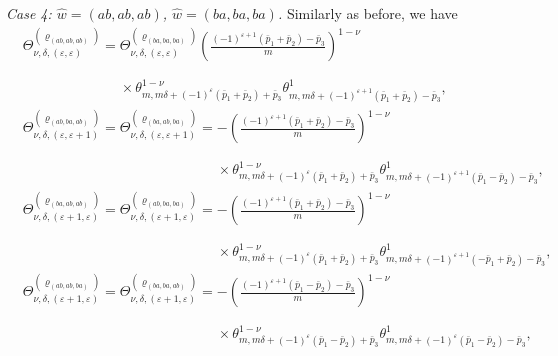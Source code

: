 \documentclass[10pt,a4paper]{amsart}
\def\bos{\varrho}
\theoremstyle{definition}
\numberwithin{equation}{section}
\begin{document}
{\em Case 4: $\hat w=(ab,ab,ab)$, $\hat w=(ba,ba,ba)$.}
Similarly as before, we have
\begin{align*}%
& \Theta_{\nu,\delta,(\varepsilon,\varepsilon)}^{(\bos_{(ab,ab,ab)})}= \Theta_{\nu,\delta,(\varepsilon,\varepsilon)}^{(\bos_{(ba,ba,ba)})} \left(\frac{(-1)^{\varepsilon+1}({\bar p_1}+{\bar p_2})-{\bar p_3}}{m}\right)^{1-\nu}\\
&\phantom{ \Theta_{\nu,\delta,(\varepsilon,\varepsilon)}^{(\bos_{(ab,ab,ab)})}= }{}\times
 \theta^{1-\nu}_{m,m\delta+(-1)^{\varepsilon}(\bar p_1+\bar p_2)+\bar p_3} \theta^1_{m,m\delta+ (-1)^{\varepsilon+1} (\bar p_1+\bar p_2) -\bar p_3},
\\
&\Theta_{\nu,\delta,(\varepsilon,\varepsilon+1)}^{(\bos_{(ab,ba,ab)})}=\Theta_{\nu,\delta,(\varepsilon,\varepsilon+1)}^{(\bos_{(ba,ab,ba)})}=
- \left(\frac{(-1)^{\varepsilon+1}({\bar p_1}+{\bar p_2})-{\bar p_3}}{m}\right)^{1-\nu}\\
&\phantom{\Theta_{\nu,\delta,(\varepsilon,\varepsilon+1)}^{(\bos_{(ab,ba,ab)})}=\Theta_{\nu,\delta,(\varepsilon,\varepsilon+1)}^{(\bos_{(ba,ab,ba)})}=}{}\times
 \theta^{1-\nu}_{m,m\delta+(-1)^{\varepsilon}(\bar p_1+\bar p_2)+\bar p_3} \theta^1_{m,m\delta+ (-1)^{\varepsilon+1} (\bar p_1-\bar p_2) -\bar p_3},
\\
&\Theta_{\nu,\delta,(\varepsilon+1,\varepsilon)}^{(\bos_{(ba,ab,ab)})}=\Theta_{\nu,\delta,(\varepsilon+1,\varepsilon)}^{(\bos_{(ab,ba,ba)})}=
- \left(\frac{(-1)^{\varepsilon+1}({\bar p_1}+{\bar p_2})-{\bar p_3}}{m}\right)^{1-\nu}\\
&\phantom{\Theta_{\nu,\delta,(\varepsilon+1,\varepsilon)}^{(\bos_{(ba,ab,ab)})}=\Theta_{\nu,\delta,(\varepsilon+1,\varepsilon)}^{(\bos_{(ab,ba,ba)})}=}{}\times
 \theta^{1-\nu}_{m,m\delta+(-1)^{\varepsilon}(\bar p_1+\bar p_2)+\bar p_3} \theta^1_{m,m\delta+ (-1)^{\varepsilon+1} (-\bar p_1+\bar p_2) -\bar p_3},
\\
&\Theta_{\nu,\delta,(\varepsilon+1,\varepsilon)}^{(\bos_{(ab,ab,ba)})}=\Theta_{\nu,\delta,(\varepsilon+1,\varepsilon)}^{(\bos_{(ba,ba,ab)})}=
- \left(\frac{(-1)^{\varepsilon+1}({\bar p_1}-{\bar p_2})-{\bar p_3}}{m}\right)^{1-\nu}\\
&\phantom{\Theta_{\nu,\delta,(\varepsilon+1,\varepsilon)}^{(\bos_{(ab,ab,ba)})}=\Theta_{\nu,\delta,(\varepsilon+1,\varepsilon)}^{(\bos_{(ba,ba,ab)})}=}{}\times
\theta^{1-\nu}_{m,m\delta+ (-1)^{\varepsilon}({\bar p_1}-{\bar p_2})+{\bar p_3}} \theta^1_{m,m\delta+ (-1)^{\varepsilon} (\bar p_1-\bar p_2) -\bar p_3},\\

\end{align*}
\end{document}
